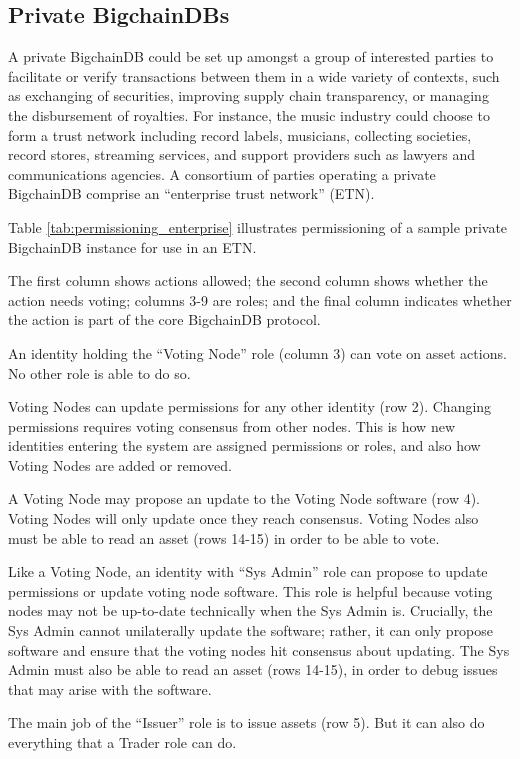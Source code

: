 \subsection{Private BigchainDBs}
A private BigchainDB could be set up amongst a group of interested parties to facilitate or verify transactions between them in a wide variety of contexts, such as exchanging of securities, improving supply chain transparency, or managing the disbursement of royalties. 
For instance, the music industry could choose to form a trust network including record labels, musicians, collecting societies, record stores, streaming services, and support providers such as lawyers and communications agencies. 
A consortium of parties operating a private BigchainDB comprise an “enterprise trust network” (ETN).

Table \ref{tab:permissioning_enterprise} illustrates permissioning of a sample private BigchainDB instance for use in an ETN.

The first column shows actions allowed; the second column shows whether the action needs voting; columns 3-9 are roles; and the final column indicates whether the action is part of the core BigchainDB protocol.

An identity holding the “Voting Node” role (column 3) can vote on asset actions. No other role is able to do so.

Voting Nodes can update permissions for any other identity (row 2). 
Changing permissions requires voting consensus from other nodes. 
This is how new identities entering the system are assigned permissions or roles, and also how Voting Nodes are added or removed.

A Voting Node may propose an update to the Voting Node software (row 4).
Voting Nodes will only update once they reach consensus.
Voting Nodes also must be able to read an asset (rows 14-15) in order to be able to vote.

Like a Voting Node, an identity with “Sys Admin” role can propose to update permissions or update voting node software. 
This role is helpful because voting nodes may not be up-to-date technically when the Sys Admin is. 
Crucially, the Sys Admin cannot unilaterally update the software; rather, it can only propose software and ensure that the voting nodes hit consensus about updating. 
The Sys Admin must also be able to read an asset (rows 14-15), in order to debug issues that may arise with the software.

The main job of the “Issuer” role is to issue assets (row 5).
But it can also do everything that a Trader role can do.

